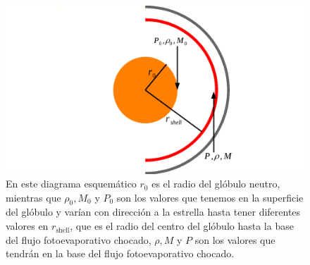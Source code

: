 \documentclass{book}
\begin{document}
\begin{figure}[htb]
    \centering \includegraphics[width=\textwidth]{imagenes_corregidas/Arreglo 02_n.pdf}
    \caption{En este diagrama esquemático $r_0$ es el radio del
      glóbulo neutro, mientras que $\rho_0,M_0$ y $P_0$ son los valores
      que tenemos en la superficie del glóbulo y varían con dirección
      a la estrella hasta tener diferentes valores en
      $r_\mathrm{shell}$, que es el radio del centro del glóbulo hasta
      la base del flujo fotoevaporativo chocado, $\rho,M$ y $P$ son los
      valores que tendrán en la base del flujo fotoevaporativo
      chocado.}
    \label{fig:parameters}
\end{figure}
\end{document}
